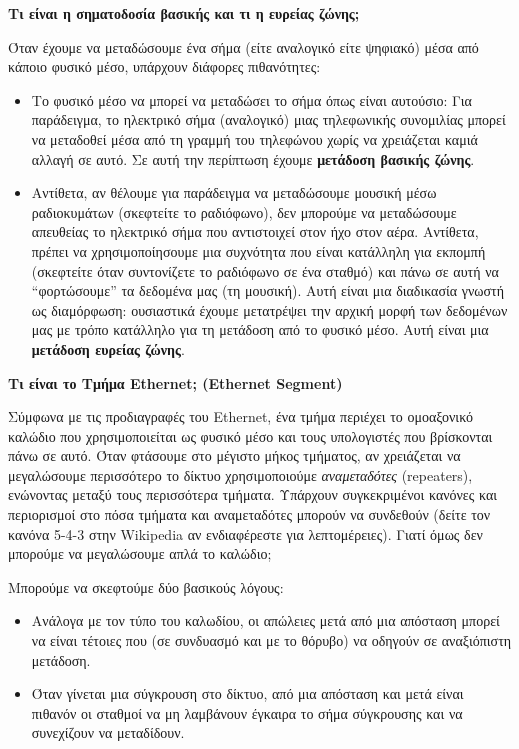 \begin{inthebox}
\textbf{Τι είναι η σηματοδοσία βασικής και τι η ευρείας ζώνης;}

Όταν έχουμε να μεταδώσουμε ένα σήμα (είτε αναλογικό είτε ψηφιακό) μέσα από κάποιο φυσικό μέσο, υπάρχουν διάφορες πιθανότητες:

\begin{itemize}
\item Το φυσικό μέσο να μπορεί να μεταδώσει το σήμα όπως είναι αυτούσιο: Για παράδειγμα, το ηλεκτρικό σήμα (αναλογικό) μιας τηλεφωνικής συνομιλίας μπορεί να μεταδοθεί μέσα από τη γραμμή του τηλεφώνου χωρίς να χρειάζεται καμιά αλλαγή σε αυτό. Σε αυτή την περίπτωση έχουμε \textbf{μετάδοση βασικής ζώνης}.
\item Αντίθετα, αν θέλουμε για παράδειγμα να μεταδώσουμε μουσική μέσω ραδιοκυμάτων (σκεφτείτε το ραδιόφωνο), δεν μπορούμε να μεταδώσουμε απευθείας το ηλεκτρικό σήμα που αντιστοιχεί στον ήχο στον αέρα. Αντίθετα, πρέπει να χρησιμοποίησουμε μια συχνότητα που είναι κατάλληλη για εκπομπή (σκεφτείτε όταν συντονίζετε το ραδιόφωνο σε ένα σταθμό) και πάνω σε αυτή να ``φορτώσουμε'' τα δεδομένα μας (τη μουσική). Αυτή είναι μια διαδικασία γνωστή ως διαμόρφωση: ουσιαστικά έχουμε μετατρέψει την αρχική μορφή των δεδομένων μας με τρόπο κατάλληλο για τη μετάδοση από το φυσικό μέσο. Αυτή είναι μια \textbf{μετάδοση ευρείας ζώνης}.
\end{itemize}

\textbf{Τι είναι το Τμήμα Ethernet; (Ethernet Segment)}

Σύμφωνα με τις προδιαγραφές του Ethernet, ένα τμήμα περιέχει το ομοαξονικό καλώδιο που χρησιμοποιείται ως φυσικό μέσο και τους υπολογιστές που βρίσκονται πάνω σε αυτό. Όταν φτάσουμε στο μέγιστο μήκος τμήματος, αν χρειάζεται να μεγαλώσουμε περισσότερο το δίκτυο χρησιμοποιούμε \emph{αναμεταδότες} (repeaters), ενώνοντας μεταξύ τους περισσότερα τμήματα. Υπάρχουν συγκεκριμένοι κανόνες και περιορισμοί στο πόσα τμήματα και αναμεταδότες μπορούν να συνδεθούν (δείτε τον κανόνα 5-4-3 στην Wikipedia αν ενδιαφέρεστε για λεπτομέρειες). Γιατί όμως δεν μπορούμε να μεγαλώσουμε απλά το καλώδιο;

Μπορούμε να σκεφτούμε δύο βασικούς λόγους:

\begin{itemize}
\item Ανάλογα με τον τύπο του καλωδίου, οι απώλειες μετά από μια απόσταση μπορεί να είναι τέτοιες που (σε συνδυασμό και με το θόρυβο) να οδηγούν σε αναξιόπιστη μετάδοση.
\item Όταν γίνεται μια σύγκρουση στο δίκτυο, από μια απόσταση και μετά είναι πιθανόν οι σταθμοί να μη λαμβάνουν έγκαιρα το σήμα σύγκρουσης και να συνεχίζουν να μεταδίδουν.
\end{itemize}
\end{inthebox}

